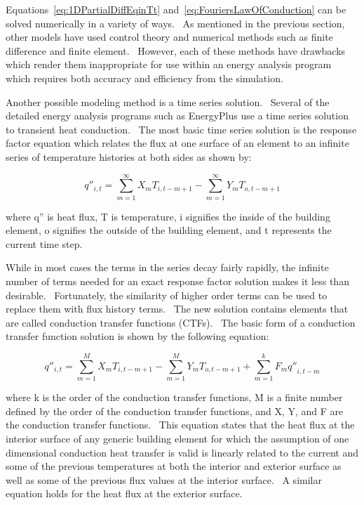 Equations~\ref{eq:1DPartialDiffEqinTt} and~\ref{eq:FouriersLawOfConduction} can be solved numerically in a variety of ways.~ As mentioned in the previous section, other models have used control theory and numerical methods such as finite difference and finite element.~ However, each of these methods have drawbacks which render them inappropriate for use within an energy analysis program which requires both accuracy and efficiency from the simulation.

Another possible modeling method is a time series solution.~ Several of the detailed energy analysis programs such as EnergyPlus use a time series solution to transient heat conduction.~ The most basic time series solution is the response factor equation which relates the flux at one surface of an element to an infinite series of temperature histories at both sides as shown by:

\begin{equation}
{q''_{i,t}} = \sum\limits_{m = 1}^\infty  {{X_m}{T_{i,t - m + 1}}}  - \sum\limits_{m = 1}^\infty  {{Y_m}{T_{o,t - m + 1}}}
\end{equation}

where q'' is heat flux, T is temperature, i signifies the inside of the building element, o signifies the outside of the building element, and t represents the current time step.

While in most cases the terms in the series decay fairly rapidly, the infinite number of terms needed for an exact response factor solution makes it less than desirable.~ Fortunately, the similarity of higher order terms can be used to replace them with flux history terms.~ The new solution contains elements that are called conduction transfer functions (CTFs).~ The basic form of a conduction transfer function solution is shown by the following equation:

\begin{equation}
{q''_{i,t}} = \sum\limits_{m = 1}^M {{X_m}{T_{i,t - m + 1}}}  - \sum\limits_{m = 1}^M {{Y_m}{T_{o,t - m + 1}}}  + \sum\limits_{m = 1}^k {{F_m}{{q''}_{i,t - m}}}
\label{eq:LaplaceTransformDeriv623}
\end{equation}

where k is the order of the conduction transfer functions, M is a finite number defined by the order of the conduction transfer functions, and X, Y, and F are the conduction transfer functions.~ This equation states that the heat flux at the interior surface of any generic building element for which the assumption of one dimensional conduction heat transfer is valid is linearly related to the current and some of the previous temperatures at both the interior and exterior surface as well as some of the previous flux values at the interior surface.~ A similar equation holds for the heat flux at the exterior surface.

